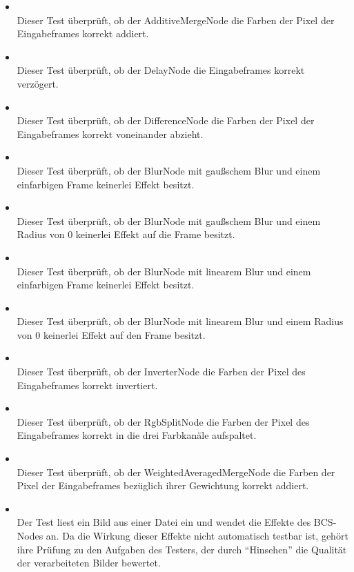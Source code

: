 \begin{itemize}

\item{}~\\
Dieser Test überprüft, ob der AdditiveMergeNode die Farben der Pixel der Eingabeframes korrekt addiert.

\item{}~\\
Dieser Test überprüft, ob der DelayNode die Eingabeframes korrekt verzögert.

\item{}~\\
Dieser Test überprüft, ob der DifferenceNode die Farben der Pixel der Eingabeframes korrekt voneinander abzieht.

\item{}~\\
Dieser Test überprüft, ob der BlurNode mit gaußschem Blur und einem einfarbigen Frame keinerlei Effekt besitzt.

\item{}~\\
Dieser Test überprüft, ob der BlurNode mit gaußschem Blur und einem Radius von 0 keinerlei Effekt auf die Frame besitzt.

\item{}~\\
Dieser Test überprüft, ob der BlurNode mit linearem Blur und einem einfarbigen Frame keinerlei Effekt besitzt.

\item{}~\\
Dieser Test überprüft, ob der BlurNode mit linearem Blur und einem Radius von 0 keinerlei Effekt auf den Frame besitzt.

\item{}~\\
Dieser Test überprüft, ob der InverterNode die Farben der Pixel des Eingabeframes korrekt invertiert.

\item{}~\\
Dieser Test überprüft, ob der RgbSplitNode die Farben der Pixel des Eingabeframes korrekt in die drei Farbkanäle aufspaltet.

\item{}~\\
Dieser Test überprüft, ob der WeightedAveragedMergeNode die Farben der Pixel der Eingabeframes bezüglich ihrer Gewichtung korrekt addiert.

\item{}~\\
Der Test liest ein Bild aus einer Datei ein und wendet die Effekte des BCS-Nodes an. Da die Wirkung dieser Effekte nicht automatisch testbar ist, gehört ihre Prüfung zu den Aufgaben des Testers, der durch ``Hinsehen'' die Qualität der verarbeiteten Bilder bewertet.

\end{itemize}

